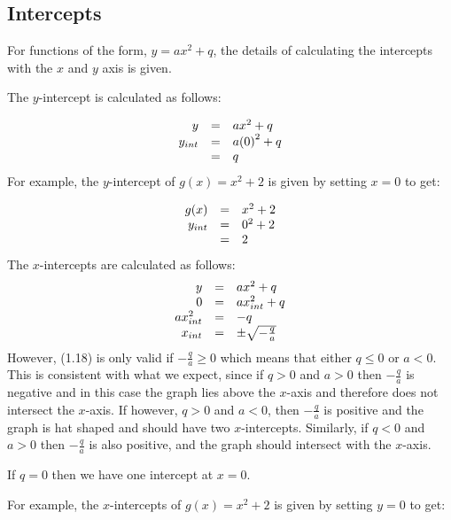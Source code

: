 \subsection*{ Intercepts}

For functions of the form, $y=a{x}^{2}+q$, the details of calculating the intercepts with the $x$ and $y$ axis is given.\par 
The $y$-intercept is calculated as follows:

\begin{equation*}
\begin{array}{ccc}\hfill y& =& a{x}^{2}+q\hfill \\ \hfill {y}_{int}& =& a{(0)}^{2}+q\hfill \\ & =& q\hfill \end{array}
\end{equation*}
For example, the $y$-intercept of $g(x)={x}^{2}+2$ is given by setting $x=0$ to get:\par 

\begin{equation*}
\begin{array}{ccc}\hfill g(x)& =& {x}^{2}+2\hfill \\ 
\hfill {y}_{int}& =& {0}^{2}+2\hfill \\
 & =& 2\hfill 
\end{array}
\end{equation*}
The $x$-intercepts are calculated as follows:
\begin{equation*}
\begin{array}{ccc}\hfill y& =& a{x}^{2}+q\hfill \\
 \hfill 0& =& ax_{int}^{2}+q\hfill \\
 \hfill ax_{int}^{2}& =& -q\hfill \\
 \hfill {x}_{int}& =& \ensuremath{\pm}\sqrt{-\frac{q}{a}}\hfill 
\end{array}
\end{equation*}
However, (1.18) is only valid if $-\frac{q}{a}\ge 0$ which means that either $q\le 0$ or $a<0$. This is consistent with what we expect, since if $q>0$ and $a>0$ then $-\frac{q}{a}$ is negative and in this case the graph lies above the $x$-axis and therefore does not intersect the $x$-axis. If however, $q>0$ and $a<0$, then $-\frac{q}{a}$ is positive and the graph is hat shaped and should have two $x$-intercepts. Similarly, if $q<0$ and $a>0$ then $-\frac{q}{a}$ is also positive, and the graph should intersect with the $x$-axis.\par 
If $q=0$ then we have one intercept at $x=0$.\par 
For example, the $x$-intercepts of $g(x)={x}^{2}+2$ is given by setting $y=0$ to get:

